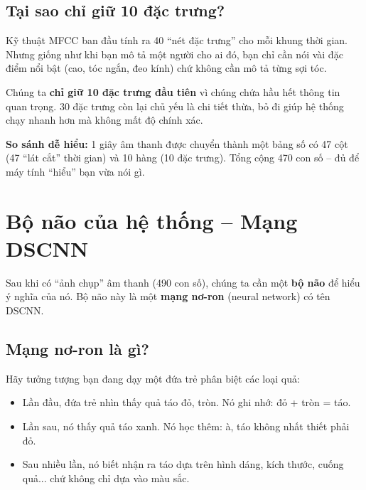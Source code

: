 \documentclass[12pt,a4paper]{article}
\begin{document}
\subsection{Tại sao chỉ giữ 10 đặc trưng?}

Kỹ thuật MFCC ban đầu tính ra 40 ``nét đặc trưng'' cho mỗi khung thời gian.
Nhưng giống như khi bạn mô tả một người cho ai đó, bạn chỉ cần nói vài đặc
điểm nổi bật (cao, tóc ngắn, đeo kính) chứ không cần mô tả từng sợi tóc.

Chúng ta \textbf{chỉ giữ 10 đặc trưng đầu tiên} vì chúng chứa hầu hết thông
tin quan trọng. 30 đặc trưng còn lại chủ yếu là chi tiết thừa, bỏ đi giúp hệ
thống chạy nhanh hơn mà không mất độ chính xác.

\begin{examplebox}
\textbf{So sánh dễ hiểu:} 1 giây âm thanh được chuyển thành một bảng số có
47 cột (47 ``lát cắt'' thời gian) và 10 hàng (10 đặc trưng). Tổng cộng 470
con số -- đủ để máy tính ``hiểu'' bạn vừa nói gì.
\end{examplebox}


\section{Bộ não của hệ thống -- Mạng DSCNN}

Sau khi có ``ảnh chụp'' âm thanh (490 con số), chúng ta cần một \textbf{bộ não}
để hiểu ý nghĩa của nó. Bộ não này là một \textbf{mạng nơ-ron} (neural network)
có tên DSCNN.

\subsection{Mạng nơ-ron là gì?}

Hãy tưởng tượng bạn đang dạy một đứa trẻ phân biệt các loại quả:

\begin{itemize}[leftmargin=1.5cm]
    \item Lần đầu, đứa trẻ nhìn thấy quả táo đỏ, tròn. Nó ghi nhớ: đỏ + tròn = táo.
    \item Lần sau, nó thấy quả táo xanh. Nó học thêm: à, táo không nhất thiết phải đỏ.
    \item Sau nhiều lần, nó biết nhận ra táo dựa trên hình dáng, kích thước, cuống quả...
          chứ không chỉ dựa vào màu sắc.
\end{itemize}
\end{document}

